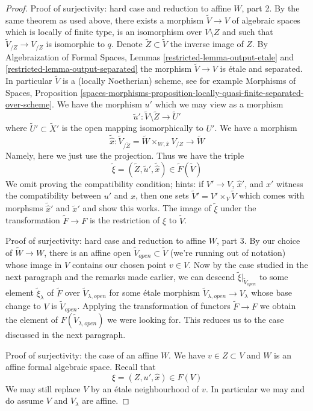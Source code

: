 \documentclass[10pt,a4paper]{amsart}
\theoremstyle{plain}
\theoremstyle{definition}
\theoremstyle{remark}
\numberwithin{equation}{subsection}
\begin{document}
\begin{proof}
\medskip\noindent
Proof of surjectivity: hard case and reduction to affine $W$, part 2.
By the same theorem as used above, there exists a morphism
$\tilde V \to V$ of algebraic spaces which is locally of finite type,
is an isomorphism over $V \setminus Z$ and such that
$\tilde V_{/Z} \to V_{/Z}$ is isomorphic to $q$.
Denote $\tilde Z \subset \tilde V$ the inverse image of $Z$.
By Algebraization of Formal Spaces, Lemmas
\ref{restricted-lemma-output-etale} and \ref{restricted-lemma-output-separated}
the morphism $\tilde V \to V$ is \'etale and separated.
In particular $\tilde V$ is a (locally Noetherian) scheme, see for example
Morphisms of Spaces, Proposition
\ref{spaces-morphisms-proposition-locally-quasi-finite-separated-over-scheme}.
We have the morphism $u'$ which we may view as a morphism
$$
\tilde u' : \tilde V \setminus \tilde Z \longrightarrow \tilde U'
$$
where $\tilde U' \subset \tilde X'$ is the open mapping isomorphically
to $U'$. We have a morphism
$$
\tilde {\hat x} :
\tilde V_{/\tilde Z} = \tilde W \times_{W, \hat x} V_{/Z}
\longrightarrow
\tilde W
$$
Namely, here we just use the projection. Thus we have the triple
$$
\tilde \xi = (\tilde Z, \tilde u', \tilde {\hat x}) \in \tilde F(\tilde V)
$$
We omit proving the compatibility condition; hints: if $V' \to V$, $\hat x'$,
and $x'$ witness the compatibility between $u'$ and $\hat x$, then one
sets $\tilde V' = V' \times_V \tilde V$ which comes with morphsms
$\tilde{\hat x}'$ and $\tilde x'$ and show this works.
The image of $\tilde \xi$ under the transformation $\tilde F \to F$
is the restriction of $\xi$ to $\tilde V$.

\medskip\noindent
Proof of surjectivity: hard case and reduction to affine $W$, part 3.
By our choice of $\tilde W \to W$, there is an affine open
$\tilde V_{open} \subset \tilde V$ (we're running out of notation)
whose image in $V$ contains our chosen point $v \in V$.
Now by the case studied in the next paragraph and the remarks made
earlier, we can descend $\tilde \xi|_{\tilde V_{open}}$
to some element $\tilde \xi_\lambda$ of $\tilde F$ over
$\tilde V_{\lambda, open}$
for some \'etale morphism $\tilde V_{\lambda, open} \to V_\lambda$
whose base change to $V$ is $\tilde V_{open}$.
Applying the transformation of functors $\tilde F \to F$
we obtain the element of $F(\tilde V_{\lambda, open})$
we were looking for. This reduces us to the case discussed
in the next paragraph.

\medskip\noindent
Proof of surjectivity: the case of an affine $W$. We have $v \in Z \subset V$
and $W$ is an affine formal algebraic space. Recall that
$$
\xi = (Z, u', \hat x) \in F(V)
$$
We may still replace $V$ by an \'etale neighbourhood of $v$.
In particular we may and do assume $V$ and $V_\lambda$ are affine.


\end{proof}
\end{document}
